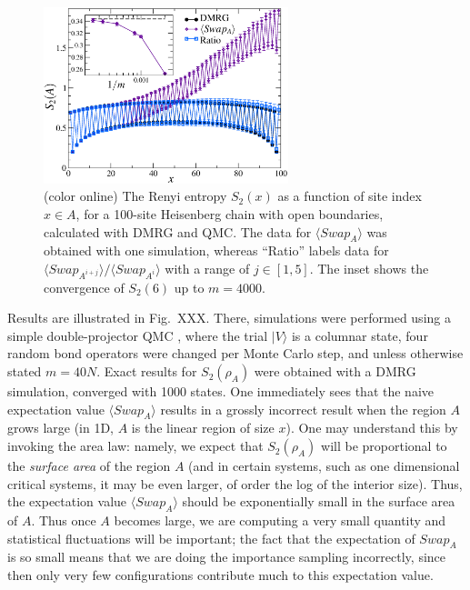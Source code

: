 \documentclass[prl,aps,twocolumn,floatfix,amsmath,amssymb,superscriptaddress,tightenlines]{revtex4}
\begin{document}
\begin{figure} {
\includegraphics[width=2.8in]{L100_fig2.eps} \caption{(color online) 
\label{1Dfig}
The Renyi entropy $S_2(x)$ as a function of site index $x \in A$, for a 100-site Heisenberg chain with open boundaries, 
calculated with DMRG and QMC.  The data for $\langle Swap_A \rangle$ was obtained with one simulation, whereas ``Ratio'' labels data for 
${\langle Swap_{A^{i+j}}\rangle}/{\langle Swap_{A^{i}}\rangle}$
with a range of  $j \in [1,5]$.  The inset shows the convergence of $S_2(6)$ up to $m=4000$.
}
} \end{figure}

Results are illustrated in Fig.~XXX.  There, simulations were performed using a simple double-projector QMC \cite{Sandvik}, where
the trial $| V \rangle$ is a columnar state, four random bond operators were changed per Monte Carlo step, and unless otherwise
stated $m=40N$.  Exact results for $S_2(\rho_A)$ were obtained with a DMRG simulation, converged with 1000 states.  One 
immediately sees that the naive expectation value $\langle Swap_A \rangle$ results in a grossly incorrect result when the region
$A$ grows large (in 1D, $A$ is the linear region of size $x$).   
One may understand this by invoking the area law: namely,
we expect
that $S_2(\rho_A)$ will be proportional to the {\it surface area} of the region
$A$ (and in certain systems, such as one dimensional critical systems, it
may be even larger, of order the log of the interior size).  Thus,
the expectation value $\langle Swap_A \rangle$ should be exponentially small in the
surface area of $A$.  Thus once $A$ becomes
large, we are computing a very small quantity and
statistical fluctuations will be important;
the fact that the expectation
of $Swap_A$ is so small means that we are doing the importance sampling
incorrectly, since then only very few configurations contribute much to this
expectation value.
\end{document}
